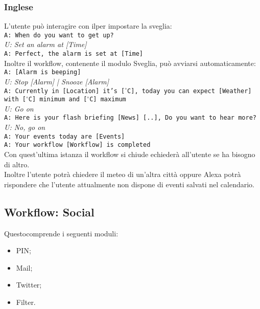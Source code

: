 \subsubsection{Inglese}
L'utente può interagire con ilper impostare la sveglia:\\
\texttt{A: When do you want to get up?}\\
\textit{U: Set an alarm at [Time]}\\
\texttt{A: Perfect, the alarm is set at [Time]}\\

Inoltre il workflow, contenente il modulo Sveglia, può avviarsi automaticamente:\\
\newline
\texttt{A: [Alarm is beeping]}\\
\textit{U: Stop [Alarm] | Snooze [Alarm]}\\
\texttt{A: Currently in [Location] it's [$^\circ$C], today you can expect [Weather] with [$^\circ$C] minimum and [$^\circ$C] maximum}\\
\textit{U: Go on}\\
\texttt{A: Here is your flash briefing [News] [..], Do you want to hear more?}\\
\textit{U: No, go on}\\
\texttt{A: Your events today are [Events]}\\
\texttt{A: Your workflow [Workflow] is completed}\\

Con quest'ultima istanza il workflow si chiude echiederà all'utente se ha bisogno di altro.\\
Inoltre l'utente potrà chiedere il meteo di un'altra città oppure Alexa potrà rispondere che l'utente attualmente non dispone di eventi salvati nel calendario.

\subsection{Workflow: Social}
Questocomprende i seguenti moduli:
\begin{itemize}
	\item PIN;
	\item Mail;
	\item Twitter;
	\item Filter.
\end{itemize}
